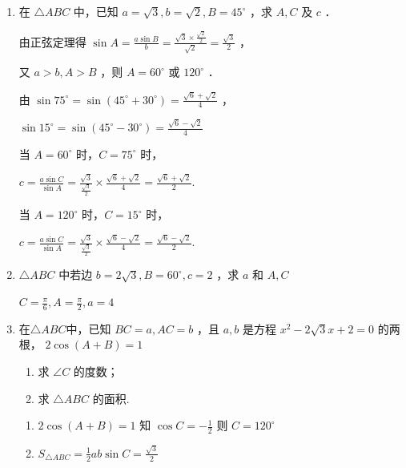 \begin{enumerate}
\begin{jieda}
\end{jieda}

\item 在 $\triangle ABC$ 中，已知 $a=\sqrt{3}, b=\sqrt{2}, B=45^{\circ}$ ，求 $A, C$ 及 $c$ ．
\begin{jieda}
由正弦定理得 $\sin A=\frac{a \sin B}{b}=\frac{\sqrt{3} \times \frac{\sqrt{2}}{2}}{\sqrt{2}}=\frac{\sqrt{3}}{2}$ ，

又 $a>b, A>B$ ，则 $A=60^{\circ}$ 或 $120^{\circ}$ ．

由 $\sin 75^{\circ}=\sin \left(45^{\circ}+30^{\circ}\right)=\frac{\sqrt{6}+\sqrt{2}}{4}$ ，

$
\sin 15^{\circ}=\sin \left(45^{\circ}-30^{\circ}\right)=\frac{\sqrt{6}-\sqrt{2}}{4}
$

当 $A=60^{\circ}$ 时，$C=75^{\circ}$ 时，

$
c=\frac{a \sin C}{\sin A}=\frac{\sqrt{3}}{\frac{\sqrt{3}}{2}} \times \frac{\sqrt{6}+\sqrt{2}}{4}=\frac{\sqrt{6}+\sqrt{2}}{2} .
$

当 $A=120^{\circ}$ 时，$C=15^{\circ}$ 时，

$
c=\frac{a \sin C}{\sin A}=\frac{\sqrt{3}}{\frac{\sqrt{3}}{2}} \times \frac{\sqrt{6}-\sqrt{2}}{4}=\frac{\sqrt{6}-\sqrt{2}}{2} .
$

\end{jieda}

\item $\triangle A B C$ 中若边 $b=2 \sqrt{3}, B=60^{\circ}, c=2$ ，求 $a$ 和 $A, C$
\begin{jieda}
    $C=\frac{\pi}{6}, A=\frac{\pi}{2}, a=4$
\end{jieda}

\item 在$\triangle A B C$中，已知 $BC=a, AC=b$ ，且 $a, b$ 是方程 $x^2-2 \sqrt{3} x+2=0$ 的两根， $2 \cos (A+B)=1$
\begin{enumerate}
    \item 求 $\angle C$ 的度数；
    \item 求 $\triangle A B C$ 的面积.
\end{enumerate}
\begin{jieda}
\begin{enumerate}
    \item $2 \cos (A+B)=1$ 知 $\cos C=-\frac{1}{2}$ 则 $C=120^{\circ}$                                                                                                                                                                                                                                                             
    \item $S_{\triangle A B C}=\frac{1}{2} a b \sin C=\frac{\sqrt{3}}{2}$
\end{enumerate}
\end{jieda}


\end{enumerate}
